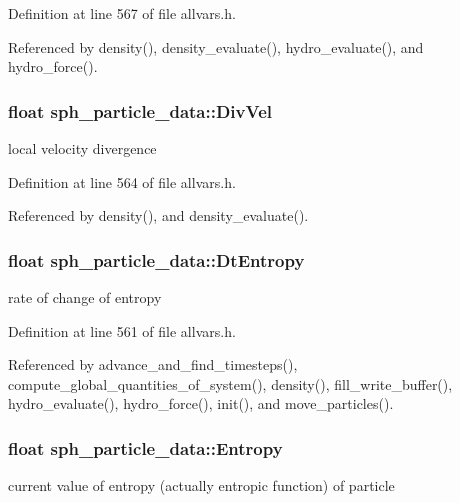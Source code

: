 Definition at line 567 of file allvars.h.



Referenced by density(), density\_\-evaluate(), hydro\_\-evaluate(), and hydro\_\-force().

\hypertarget{structsph__particle__data_a1af47e5f5e7ef9e4a656411c468c8d14}{
\subsubsection[{DivVel}]{\setlength{\rightskip}{0pt plus 5cm}float {\bf sph\_\-particle\_\-data::DivVel}}}
\label{structsph__particle__data_a1af47e5f5e7ef9e4a656411c468c8d14}
local velocity divergence 

Definition at line 564 of file allvars.h.



Referenced by density(), and density\_\-evaluate().

\hypertarget{structsph__particle__data_a27aeefa50674867d3dec1c359b7191c8}{
\subsubsection[{DtEntropy}]{\setlength{\rightskip}{0pt plus 5cm}float {\bf sph\_\-particle\_\-data::DtEntropy}}}
\label{structsph__particle__data_a27aeefa50674867d3dec1c359b7191c8}
rate of change of entropy 

Definition at line 561 of file allvars.h.



Referenced by advance\_\-and\_\-find\_\-timesteps(), compute\_\-global\_\-quantities\_\-of\_\-system(), density(), fill\_\-write\_\-buffer(), hydro\_\-evaluate(), hydro\_\-force(), init(), and move\_\-particles().

\hypertarget{structsph__particle__data_a7cbe9bb2086f525f400b2c12103b3116}{
\subsubsection[{Entropy}]{\setlength{\rightskip}{0pt plus 5cm}float {\bf sph\_\-particle\_\-data::Entropy}}}
\label{structsph__particle__data_a7cbe9bb2086f525f400b2c12103b3116}
current value of entropy (actually entropic function) of particle 

